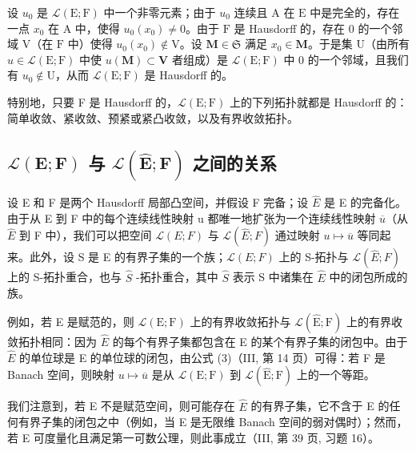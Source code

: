 设 \(u_0\) 是 \(\mathcal{L}(\mathrm{E};\mathrm{F})\) 中一个非零元素；由于 \(u_0\) 连续且 \(\mathrm{A}\) 在 \(\mathrm{E}\) 中是完全的，存在一点 \(x_0\) 在 \(\mathrm{A}\) 中，使得 \(u_0(x_0) \neq 0\)。由于 \(\mathrm{F}\) 是 Hausdorff 的，存在 0 的一个邻域 \(\mathrm{V}\)（在 \(\mathrm{F}\) 中）使得 \(u_0(x_0) \notin \mathrm{V}\)。设 \(\mathbf{M} \in \mathfrak{S}\) 满足 \(x_0 \in \mathbf{M}\)。于是集 \(\mathrm{U}\)（由所有 \(u \in \mathcal{L}(\mathrm{E};\mathrm{F})\) 中使 \(u(\mathbf{M}) \subset \mathbf{V}\) 者组成）是 \(\mathcal{L}(\mathrm{E};\mathrm{F})\) 中 0 的一个邻域，且我们有 \(u_0 \notin \mathrm{U}\)，从而 \(\mathcal{L}(\mathrm{E};\mathrm{F})\) 是 Hausdorff 的。

特别地，只要 F 是 Hausdorff 的，\(\mathcal{L}(\mathrm{E};\mathrm{F})\) 上的下列拓扑就都是 Hausdorff 的：简单收敛、紧收敛、预紧或紧凸收敛，以及有界收敛拓扑。

\subsection{\texorpdfstring{\(\mathcal{L}(\mathbf{E};\mathbf{F})\) 与 \(\mathcal{L}(\hat{\mathbf{E}};\mathbf{F})\) 之间的关系}{\textbackslash mathcal\{L\}(\textbackslash mathbf\{E\};\textbackslash mathbf\{F\}) 与 \textbackslash mathcal\{L\}(\textbackslash hat\{\textbackslash mathbf\{E\}\};\textbackslash mathbf\{F\}) 之间的关系}}

设 E 和 F 是两个 Hausdorff 局部凸空间，并假设 F 完备；设 \(\hat{E}\) 是 E 的完备化。由于从 E 到 F 中的每个连续线性映射 u 都唯一地扩张为一个连续线性映射 \(\overline{u}\)（从 \(\hat{E}\) 到 F 中），我们可以把空间 \(\mathcal{L}(E;F)\) 与 \(\mathcal{L}(\hat{E};F)\) 通过映射 \(u\mapsto\overline{u}\) 等同起来。此外，设 S 是 E 的有界子集的一个族；\(\mathcal{L}(E;F)\) 上的 S-拓扑与 \(\mathcal{L}(\hat{E};F)\) 上的 S-拓扑重合，也与 \(\hat{S}\) -拓扑重合，其中 \(\hat{S}\) 表示 S 中诸集在 \(\hat{E}\) 中的闭包所成的族。

例如，若 E 是赋范的，则 \(\mathcal{L}(\mathrm{E};\mathrm{F})\) 上的有界收敛拓扑与 \(\mathcal{L}(\hat{\mathrm{E}};\mathrm{F})\) 上的有界收敛拓扑相同：因为 \(\hat{E}\) 的每个有界子集都包含在 E 的某个有界子集的闭包中。由于 \(\hat{E}\) 的单位球是 E 的单位球的闭包，由公式 (3)（III, 第 14 页）可得：若 F 是 Banach 空间，则映射 \(u\mapsto\overline{u}\) 是从 \(\mathcal{L}(\mathrm{E};\mathrm{F})\) 到 \(\mathcal{L}(\hat{\mathrm{E}};\mathrm{F})\) 上的一个等距。

我们注意到，若 E 不是赋范空间，则可能存在 \(\hat{E}\) 的有界子集，它不含于 E 的任何有界子集的闭包之中（例如，当 E 是无限维 Banach 空间的弱对偶时）；然而，若 E 可度量化且满足第一可数公理，则此事成立（III, 第 39 页, 习题 16）。

